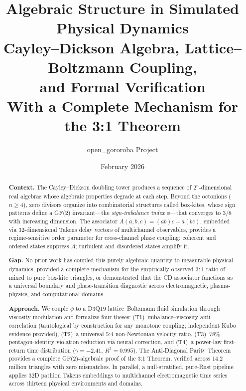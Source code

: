 \documentclass[12pt,openany]{report}
\title{\textbf{Algebraic Structure in Simulated Physical Dynamics} \\[0.3em]
\Large Cayley--Dickson Algebra, Lattice--Boltzmann Coupling, \\
and Formal Verification \\[0.5em]
\large With a Complete Mechanism for the 3:1 Theorem}
\author{open\_gororoba Project}
\date{February 2026}
\theoremstyle{definition}
\theoremstyle{plain}
\theoremstyle{remark}
\begin{document}
\hypersetup{pageanchor=false}  %

\maketitle


\begin{abstract}
\textbf{Context.}
The Cayley--Dickson doubling tower produces a sequence of
$2^n$-dimensional real algebras whose algebraic properties degrade at
each step.  Beyond the octonions ($n \geq 4$), zero divisors organize
into combinatorial structures called box-kites, whose sign patterns
define a GF(2) invariant---the \emph{sign-imbalance index}
$\phi$---that converges to $3/8$ with increasing dimension.
The associator $A(a,b,c) = (ab)c - a(bc)$, embedded via
32-dimensional Takens delay vectors of multichannel observables,
provides a regime-sensitive order parameter for cross-channel phase
coupling: coherent and ordered states suppress $A$; turbulent and
disordered states amplify it.

\textbf{Gap.}
No prior work has coupled this purely algebraic quantity to measurable
physical dynamics, provided a complete mechanism for the empirically
observed $3{:}1$ ratio of mixed to pure box-kite triangles, or
demonstrated that the CD associator functions as a universal
boundary and phase-transition diagnostic across electromagnetic,
plasma-physics, and computational domains.

\textbf{Approach.}
We couple $\phi$ to a D3Q19 lattice--Boltzmann fluid simulation
through viscosity modulation and formalize four theses:
(T1)~imbalance--viscosity anti-correlation (tautological by
construction for any monotone coupling; independent Kubo evidence
provided), (T2)~a universal 5:4 non-Newtonian velocity ratio,
(T3)~78\% pentagon-identity violation reduction via neural correction,
and (T4)~a power-law first-return time distribution
($\gamma = -2.41$, $R^2 = 0.995$).  The Anti-Diagonal Parity Theorem
provides a complete GF(2)-algebraic proof of the 3:1 Theorem,
verified across 14.2 million triangles with zero mismatches.
In parallel, a null-stratified, pure-Rust pipeline applies 32D
pathion Takens embeddings to multichannel electromagnetic time series
across thirteen physical environments and domains.


\end{abstract}
\end{document}

